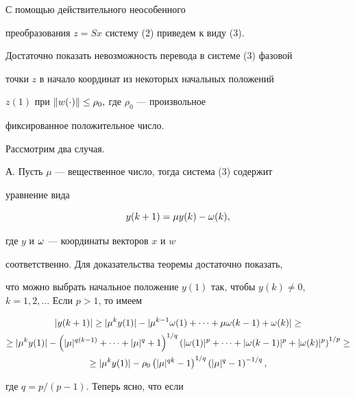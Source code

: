 \begin{pf}


С помощью действительного неособенного


преобразования $z = Sx$ систему (2) приведем к виду (3).


Достаточно показать невозможность перевода в системе (3) фазовой


точки $z $ в начало координат из некоторых начальных положений 


$z(1)$ при $\|w(\cdot)\| \leq \rho_0, $ где $\rho_0$ --- произвольное


фиксированное положительное число.


Рассмотрим два случая.


\medskip





А. Пусть $\mu$ --- вещественное число, тогда система (3) содержит


уравнение вида


$$


y(k+1) = \mu y(k) - \w(k),


$$


где $y$ и $\omega$ --- координаты векторов $x$ и $w$


соответственно. Для доказательства теоремы достаточно показать,


что можно выбрать начальное положение $y(1)$ так, чтобы $y(k)


\neq 0$, $k = 1,2,\dotsc$ Если $p > 1$, то имеем


\begin{gather*}


|y(k+1)| \geq |\mu^ky(1)| - |\mu^{k-1}\w(1) + \dotsb + \mu \w(k-1) +


\w(k) | \geq \\


%


\geq |\mu^ky(1)| - \left(|\mu|^{q(k-1)} + \dotsb + |\mu|^q


+ 1\right)^{1/q}\left(|\w(1)|^p + \dotsb + |\w(k-1)|^p +


|\w(k)|^p \right)^{1/p} \geq \\


%


\geq |\mu^ky(1)| - \rho_0 \left(|\mu|^{qk} - 1\right)^{1/q}


\left(|\mu|^q - 1\right)^{-1/q},


\end{gather*}


где $q = p/(p-1)$. Теперь ясно, что если



\end{pf}
